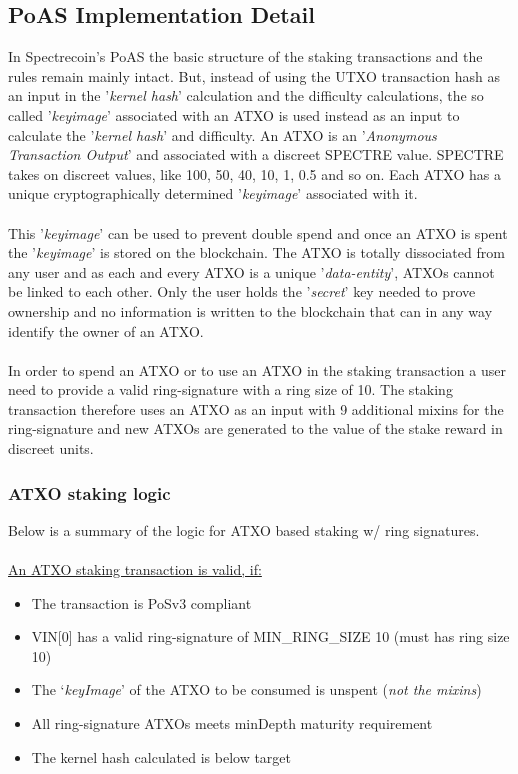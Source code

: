 \subsection{PoAS Implementation Detail}
In Spectrecoin's PoAS the basic structure of the staking transactions and
the rules remain mainly intact. But, instead of using the UTXO transaction
hash as an input in the '\textit{kernel hash}' calculation and the
difficulty calculations, the so called '\textit{keyimage}' associated with
an ATXO is used instead as an input to calculate the '\textit{kernel hash}'
and difficulty. An ATXO is an '\textit{Anonymous Transaction Output}' and
associated with a discreet SPECTRE value. SPECTRE takes on discreet values,
like 100, 50, 40, 10, 1, 0.5 and so on. Each ATXO has a unique
cryptographically determined '\textit{keyimage}' associated with it.
\\
\\
\noindent
This '\textit{keyimage}' can be used to prevent double spend and once an
ATXO is spent the '\textit{keyimage}' is stored on the blockchain. The ATXO
is totally dissociated from any user and as each and every ATXO is a unique
'\textit{data-entity}', ATXOs cannot be linked to each other. Only the user
holds the '\textit{secret}' key needed to prove ownership and no information
is written to the blockchain that can in any way identify the owner of an
ATXO.
\\
\\
\noindent
In order to spend an ATXO or to use an ATXO in the staking transaction a user
need to provide a valid ring-signature with a ring size of 10. The staking
transaction therefore uses an ATXO as an input with 9 additional mixins for
the ring-signature and new ATXOs are generated to the value of the stake
reward in discreet units.



\subsubsection{ATXO staking logic}
Below is a summary of the logic for ATXO based staking w/ ring signatures.
\\
\\
\noindent
\underline{An ATXO staking transaction is valid, if:}
\begin{itemize}
	\item The transaction is PoSv3 compliant
	\item VIN[0] has a valid ring-signature of MIN\_RING\_SIZE 10 (must has ring size 10)
	\item The ‘\textit{keyImage}’ of the ATXO to be consumed is unspent (\textit{not the mixins})
	\item All ring-signature ATXOs meets minDepth maturity requirement
	\item The kernel hash calculated is below target
\end{itemize}
\newpage



